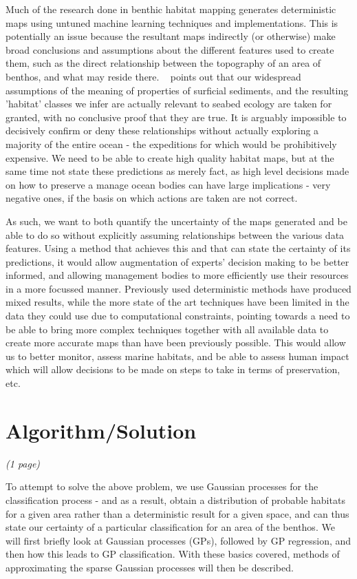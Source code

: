 \documentclass[10pt]{article}
\begin{document}
\begin{multicols}{2}
    Much of the research done in benthic habitat mapping generates deterministic maps using untuned machine learning techniques and implementations. This is potentially an issue  because the resultant maps indirectly (or otherwise) make broad conclusions and assumptions about the different features used to create them, such as the direct relationship between the topography of an area of benthos, and what may reside there. ~\citet{kostylev12} points out that our widespread assumptions of the meaning of properties of surficial sediments, and the resulting 'habitat' classes we infer are actually relevant to seabed ecology are taken for granted, with no conclusive proof that they are true. It is arguably impossible to decisively confirm or deny these relationships without actually exploring a majority of the entire ocean - the expeditions for which would be prohibitively expensive. We need to be able to create high quality habitat maps, but at the same time not state these predictions as merely fact, as high level decisions made on how to preserve a manage ocean bodies can have large implications - very negative ones, if the basis on which actions are taken are not correct.

    As such, we want to both quantify the uncertainty of the maps generated and be able to do so without explicitly assuming relationships between the various data features. Using a method that achieves this and that can state the certainty of its predictions, it would allow augmentation of experts' decision making to be better informed, and allowing management bodies to more efficiently use their resources in a more focussed manner. Previously used deterministic methods have produced mixed results, while the more state of the art techniques have been limited in the data they could use due to computational constraints, pointing towards a need to be able to bring more complex techniques together with all available data to create more accurate maps than have been previously possible. This would allow us to better monitor, assess marine habitats, and be able to assess human impact which will allow decisions to be made on steps to take in terms of preservation, etc.

    \newpage

    \section{Algorithm/Solution}
    \textit{(1 page)}

    To attempt to solve the above problem, we use Gaussian processes for the classification process - and as a result, obtain a distribution of probable habitats for a given area rather than a deterministic result for a given space, and can thus state our certainty of a particular classification for an area of the benthos. We will first briefly look at Gaussian processes (GPs), followed by GP regression, and then how this leads to GP classification. With these basics covered, methods of approximating the sparse Gaussian processes will then be described.


\end{multicols}
\end{document}
